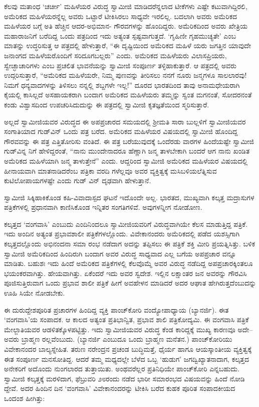 ಕೆಲವು ಮತಾಂಧ ‘ಚರ್ಚೀ’ ಮಹಿಳೆಯರ ವಿರುದ್ಧ ಸ್ವಾಮೀಜಿ ಮಾಡಿದರೆನ್ನಲಾದ ಟೀಕೆಗಳು ಎಷ್ಟೇ ಕಟುವಾಗಿದ್ದಿರಲಿ, ಅಮೆರಿಕದ ಮಹಿಳೆಯರನ್ನೆಲ್ಲ ಅವರು ಒಟ್ಟಾರೆ ಟೀಕಿಸಿರಲು ಸಾಧ್ಯವೇ ಇರಲಿಲ್ಲ. ಬದಲಾಗಿ ಅವರು ಅಮೆರಿಕದ ಮಹಿಳೆಯರ ಬಗ್ಗೆ ಅತಿ ಹೆಚ್ಚಿನ ಆದರ-ಅಭಿಮಾನ- ಗೌರವಗಳನ್ನು ಹೊಂದಿದ್ದರು. ಅಮೆರಿಕದಿಂದ ಅವರು ಖೇತ್ರಿಯ ಮಹಾರಾಜನಿಗೆ ಬರೆದಿದ್ದ ಒಂದು ಪತ್ರದಿಂದ ಇದು ಅತ್ಯಂತ ಸ್ಪಷ್ಟವಾಗುತ್ತದೆ. ‘ಗೃಹಿಣೀ ಗೃಹಮುಚ್ಯತೇ’ ಎಂಬ ಮಾತನ್ನು ಉದ್ಧರಿಸುತ್ತ ಆ ಪತ್ರದಲ್ಲಿ ಹೇಳುತ್ತಾರೆ, “ಈ ದೃಷ್ಟಿಯಿಂದ ಅಮೆರಿಕದ ಮಹಿಳೆ ಯರು ಜಗತ್ತಿನ ಯಾವುದೇ ಜನಾಂಗದ ಮಹಿಳೆಯರೊಂದಿಗೆ ಸರಿದೂಗಬಲ್ಲರು” ಎಂದು. ಅಮೆರಿಕದ ಮಹಿಳೆಯರು ವಿಲಾಸಪ್ರಿಯರು, ಸ್ವೇಚ್ಛಾಚಾರಿಗಳು ಎಂಬ ಪ್ರಚಲಿತ ಭಾವನೆಯನ್ನು ಸ್ವಾಮೀಜಿ ಸಂಪೂರ್ಣ ತಳ್ಳಿಹಾಕುತ್ತಾರೆ. ಆ ಪತ್ರದಲ್ಲಿ ಅವರು ಉದ್ಗರಿಸುತ್ತಾರೆ, “ಅಮೆರಿಕದ ಮಹಿಳೆಯರೇ, ನಿಮ್ಮ ಪುಣವನ್ನು ತೀರಿಸಲು ನನಗೆ ನೂರು ಜನ್ಮಗಳೂ ಸಾಲಲಾರವು! ನಿಮಗೆ ಧನ್ಯವಾದಗಳನ್ನು ತಿಳಿಸಲು ನನ್ನಲ್ಲಿ ಶಬ್ದಗಳೇ ಇಲ್ಲ!” ದೂರದ ಭಾರತದಿಂದ ತಾವು ಅನಾಮಧೇಯರಾಗಿ ಕೈಯಲ್ಲಿ ಕಾಸಿಲ್ಲದೆ ಅಸಹಾಯಕರಾಗಿ ಬಂದಾಗ ಅಮೆರಿಕದ ಮಹಿಳೆಯರು ತಮ್ಮನ್ನು ಸ್ವಂತ ಮಗನಂತೆ, ಸೋದರನಂತೆ ಕಂಡು ವಿಶ್ವಾಸದಿಂದ ಉಪಚರಿಸಿದುದುನ್ನು ಈ ಪತ್ರದಲ್ಲಿ ಸ್ವಾಮೀಜಿ ಕೃತಜ್ಞತೆಯಿಂದ ಸ್ಮರಿಸುತ್ತಾರೆ.

ಅಲ್ಲದೆ ಸ್ವಾಮೀಜಿಯವರ ವಿರುದ್ಧದ ಈ ಅಪಪ್ರಚಾರದ ಸಮಯದಲ್ಲಿ ಶ್ರೀಮತಿ ಸಾರಾ ಬುಲ್ಲಳಿಗೆ ಸ್ವಾಮೀಜಿಯವರ ಸಂಗಾತಿಯಾದ ಗುಡ್​ವಿನ್ ಒಂದು ಪತ್ರ ಬರೆದ. ಅಮೆರಿಕದ ಮಹಿಳೆಯರ ವಿಷಯದಲ್ಲಿ ಸ್ವಾಮೀಜಿ ಹೊಂದಿದ್ದ ಗೌರವವನ್ನು ಈ ಪತ್ರ ಎತ್ತಿತೋರಿಸು ವಂತಿದೆ. ಈ ಪತ್ರ ಬರೆಯುವುದಕ್ಕೆ ಒಂದೆರಡು ವಾರಗಳ ಹಿಂದೆಯಷ್ಟೇ ಸ್ವಾಮೀಜಿ ಗುಡ್​ವಿನ್ನ ನಿಗೆ ಹೇಳಿದ್ದರಂತೆ, “ನಾನು ಮುಂದೇನಾದರೂ ಹೆಣ್ಣಾಗಿ ಜನ್ಮ ತಾಳಬೇಕಾಗಿ ಬಂದರೆ ಆಗ ನಾನು ಖಂಡಿತ ಅಮೆರಿಕದ ಮಹಿಳೆಯಾಗಿ ಜನ್ಮ ತಾಳುತ್ತೇನೆ” ಎಂದು. ಆದ್ದರಿಂದ ಸ್ವಾಮೀಜಿ ಅಮೆರಿಕದ ಮಹಿಳೆಯರ ವಿಷಯದಲ್ಲಿ ಹೀನಾಯವಾಗಿ ಮಾತನಾಡಿದರೆಂಬ ಪತ್ರಿಕಾ ವರದಿ ಗಳೆಲ್ಲವೂ ಅವರ ವ್ಯಕ್ತಿತ್ವಕ್ಕೆ ಮಸಿಬಳಿಯಲೆತ್ನಿಸುವ ಕುಟಿಲೋಪಾಯಗಳಷ್ಟೇ ಎಂದು ಗುಡ್ ವಿನ್ ದೃಢವಾಗಿ ಹೇಳುತ್ತಾನೆ.

ಸ್ವಾಮೀಜಿ ಸಿಕ್ಕಿಹಾಕಿಕೊಂಡ ಕಹಿ-ವಿವಾದಾಸ್ಪದ ಘಟನೆ ಇದೊಂದೇ ಅಲ್ಲ. ಭಾರತದ, ಮುಖ್ಯವಾಗಿ ಕಲ್ಕತ್ತ ಮದ್ರಾಸುಗಳ ಪತ್ರಿಕೆಗಳಲ್ಲಿ ಪ್ರಧಾನವಾಗಿ ಕಾಣಿಸಿಕೊಂಡ ಇನ್ನಿತರ ಸಂಗತಿಗಳಿವೆ. ಅವುಗಳನ್ನೀಗ ನೋಡೋಣ.

ಕಲ್ಕತ್ತದ ‘ವಂಗವಾಸಿ’ ಎಂಬುದು ಎಂದಿನಿಂದಲೂ ಸ್ವಾಮೀಜಿಯವರಿಗೆ ವಿರುದ್ಧವಾಗಿಯೇ ಕೆಲಸ ಮಾಡುತ್ತಿದ್ದ ಪತ್ರಿಕೆ. ಇದು ಅಂದಿನ ಅತ್ಯಂತ ಪ್ರಭಾವಶಾಲೀ ಪತ್ರಿಕೆಗಳಲ್ಲೊಂದು. ವಿವೇಕಾನಂದರು ಅಮೆರಿಕದಲ್ಲಿ ಪಡೆದ ಯಶಸ್ಸಿಗಾಗಿ ಕಲ್ಕತ್ತದಲ್ಲೊಂದು ಅಭಿನಂದನಾ ಸಮಾ ರಂಭ ನಡೆದಾಗ ಅದನ್ನು ತಪ್ಪಿಸಲು ಈ ಪತ್ರಿಕೆ ಶಕ್ತಿ ಮೀರಿ ಪ್ರಯತ್ನಿಸಿತ್ತು. ಬಳಿಕ ಸ್ವಾಮೀಜಿ ಅಮೆರಿಕದಿಂದ ಹಿಂದಿರುಗಿ ಬಂದಾಗ ಅವರ ವಿರುದ್ಧ ಸಾಧ್ಯವಾದ ಎಲ್ಲ ಬಗೆಯ ಅಪಪ್ರಚಾರ ವನ್ನೂ ಮಾಡಿತು. ಬಹುಶಃ ಇದು ಹಿಂದೆ ಅಮೆರಿಕದ ಪತ್ರಿಕೆಗಳಲ್ಲಿ ಕೆಲವೊಮ್ಮೆ ಅವರ ವಿರುದ್ಧ ನಡೆದಿದ್ದ ಅಪಪ್ರಚಾರಕ್ಕಿಂತಲೂ ಭಯಂಕರವಾಗಿತ್ತು. ಹೇಯವಾಗಿತ್ತು. ಏಕೆಂದರೆ ಇದು ಅವರ ಸ್ವದೇಶ. ಇಲ್ಲಿನ ಲಕ್ಷಾಂತರ ಜನ ಅವರನ್ನು ಗೌರವಿಸಿ ಪೂಜಿಸುತ್ತಿರುವಾಗ ಒಂದು ಪ್ರಭಾವ ಶಾಲೀ ಪತ್ರಿಕೆ ಹೀಗೆ ಅವಹೇಳನ ಮಾಡಿದರೆ ಅದರ ಆಘಾತ ಹೇಗಿರುತ್ತದೆಂಬುದನ್ನು ಊಹಿ ಸಿಯೇ ನೋಡಬೇಕು.

ಈ ದುರುದ್ದೇಶಪೂರಿತ ಪ್ರಚಾರಗಳ ಹಿಂದಿದ್ದ ವ್ಯಕ್ತಿ ಪಾಂಚ್​ಕೋರಿ ವಂದ್ಯೋಪಾಧ್ಯಾಯ (ಬ್ಯಾನರ್ಜಿ). ಈತ ‘ವಂಗವಾಸಿ’ಯ ಸಂಪಾದಕ. ಆ ಕಾಲದ ಅತ್ಯಂತ ಪ್ರತಿಭಾನ್ವಿತ, ಪ್ರಭಾವ ಶಾಲಿ ಪತ್ರಿಕೋದ್ಯಮಿ. ಈ ವಂಗವಾಸಿ ಪತ್ರಿಕೆ ಮೇಲ್ಜಾತಿಯವರ ಆಡಳಿತಕ್ಕೊಳಪಟ್ಟಿತ್ತು. ಇದು ಸ್ವಾಮೀಜಿಯವರ ವಿರುದ್ಧ ಕೆಂಡ ಕಾರಿದ್ದಕ್ಕೆ ಮುಖ್ಯ ಕಾರಣವೂ ಅದೇ–ಅವರು ಬ್ರಾಹ್ಮಣ ರಲ್ಲವೆಂಬುದು. (ಬ್ಯಾನರ್ಜಿ ಎಂಬುದೂ ಒಂದು ಬ್ರಾಹ್ಮಣ ಮನೆತನ.) ಪಾಂಚ್​ಕೋರಿಯು ವಿವೇಕಾನಂದರ ಬಾಲ್ಯಸ್ನೇಹಿತ. ತರುಣ ನರೇಂದ್ರನ ಪ್ರಚಂಡ ಬುದ್ಧಿಮತ್ತೆ, ಧೈರ್ಯ ಹಾಗೂ ಆಯಸ್ಕಾಂತೀಯ ವ್ಯಕ್ತಿತ್ವಕ್ಕೆ ಈತ ಸಂಪೂರ್ಣ ಮನಸೋತಿದ್ದ. ಆದರೆ ತಮ್ಮ ಮಧ್ಯದಲ್ಲೇ ಬೆಳೆದ ಒಬ್ಬ ‘ಹುಡುಗ’ ಜಗದ್ವಿಖ್ಯಾತನಾದಾಗ, ಕಲ್ಕತ್ತದ ಅನೇಕರಿಗೆ ಅದೊಂದು ನುಂಗಲಾರದ ತುತ್ತಾಯಿತು. ಅಂಥವರೆಲ್ಲರ ಪ್ರತಿನಿಧಿಯೇ ಪಾಂಚ್​ಕೋರಿ ಎನ್ನಬಹುದು. ಸ್ವಾಮೀಜಿ ಕಲ್ಕತ್ತಕ್ಕೆ ಮರಳಿದಾಗ, ಫೆಬ್ರುವರಿ ೨೮ರಂದು ನಡೆದ ಭಾರೀ ಸಮಾರಂಭದ ವಿಷಯವನ್ನು ಹಿಂದೆ ನೋಡಿ ದ್ದೇವೆ. ಅದರ ಹಿಂದಿನ ದಿನ ‘ವಂಗವಾಸಿ’ ವಿವೇಕಾನಂದರನ್ನು ಟೀಕಿಸಿ ಬರೆದ ಕುಹಕ ಪೂರಿತ ಸಂಪಾದಕೀಯದ ಒಂದಂಶ ಹೀಗಿತ್ತು:

